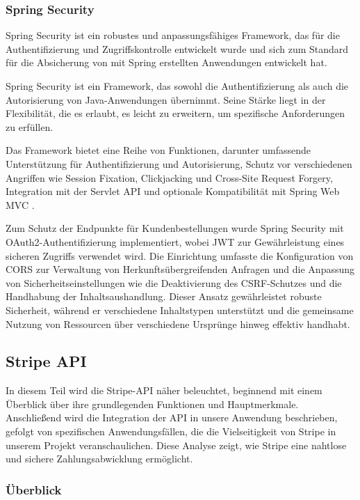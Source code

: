 \subsubsection{Spring Security}

Spring Security ist ein robustes und anpassungsfähiges Framework, das für die Authentifizierung und Zugriffskontrolle entwickelt wurde und sich zum Standard für die Absicherung von mit Spring erstellten Anwendungen entwickelt hat.

Spring Security ist ein Framework, das sowohl die Authentifizierung als auch die Autorisierung von Java-Anwendungen übernimmt. Seine Stärke liegt in der Flexibilität, die es erlaubt, es leicht zu erweitern, um spezifische Anforderungen zu erfüllen.

Das Framework bietet eine Reihe von Funktionen, darunter umfassende Unterstützung für Authentifizierung und Autorisierung, Schutz vor verschiedenen Angriffen wie Session Fixation, Clickjacking und Cross-Site Request Forgery, Integration mit der Servlet API und optionale Kompatibilität mit Spring Web MVC \cite{Spring-Security:o.J}.

Zum Schutz der Endpunkte für Kundenbestellungen wurde Spring Security mit OAuth2-Authentifizierung implementiert, wobei JWT zur Gewährleistung eines sicheren Zugriffs verwendet wird. Die Einrichtung umfasste die Konfiguration von CORS zur Verwaltung von Herkunftsübergreifenden Anfragen und die Anpassung von Sicherheitseinstellungen wie die Deaktivierung des CSRF-Schutzes und die Handhabung der Inhaltsaushandlung. Dieser Ansatz gewährleistet robuste Sicherheit, während er verschiedene Inhaltstypen unterstützt und die gemeinsame Nutzung von Ressourcen über verschiedene Ursprünge hinweg effektiv handhabt.

\subsection{Stripe API}
In diesem Teil wird die Stripe-API näher beleuchtet, beginnend mit einem Überblick über ihre grundlegenden Funktionen und Hauptmerkmale. Anschließend wird die Integration der API in unsere Anwendung beschrieben, gefolgt von spezifischen Anwendungsfällen, die die Vielseitigkeit von Stripe in unserem Projekt veranschaulichen. Diese Analyse zeigt, wie Stripe eine nahtlose und sichere Zahlungsabwicklung ermöglicht.
\subsubsection{Überblick}

